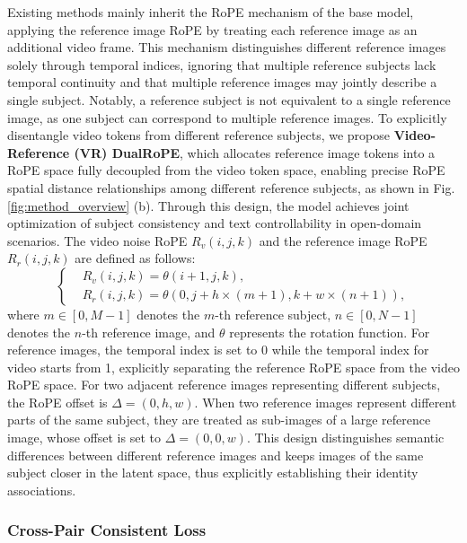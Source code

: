 Existing methods mainly inherit the RoPE mechanism of the base model, applying the reference image RoPE by treating each reference image as an additional video frame. This mechanism distinguishes different reference images solely through temporal indices, ignoring that multiple reference subjects lack temporal continuity and that multiple reference images may jointly describe a single subject. Notably, a reference subject is not equivalent to a single reference image, as one subject can correspond to multiple reference images. To explicitly disentangle video tokens from different reference subjects, we propose \textbf{Video-Reference (VR) DualRoPE}, which allocates reference image tokens into a RoPE space fully decoupled from the video token space, enabling precise RoPE spatial distance relationships among different reference subjects, as shown in Fig. \ref{fig:method_overview} (b). Through this design, the model achieves joint optimization of subject consistency and text controllability in open-domain scenarios. The video noise RoPE $R_v(i,j,k)$ and the reference image RoPE $R_r(i,j,k)$ are defined as follows:
\begin{equation}
\left\{
\begin{aligned}
& R_v(i,j,k) = \theta (i+1,j,k)  , \\
&R_r(i,j,k) = \theta(0,j+h\times(m+1),k+w\times(n+1)),
\end{aligned}
\right.
\end{equation}
where $m \in [0, M-1] $ denotes the $m$-th reference subject, $n \in [0, N-1]$ denotes the $n$-th reference image, and $\theta$ represents the rotation function. For reference images, the temporal index is set to 0 while the temporal index for video starts from 1, explicitly separating the reference RoPE space from the video RoPE space. For two adjacent reference images representing different subjects, the RoPE offset is $\Delta=(0,h,w)$. When two reference images represent different parts of the same subject, they are treated as sub-images of a large reference image, whose offset is set to $\Delta=(0,0,w)$. This design distinguishes semantic differences between different reference images and keeps images of the same subject closer in the latent space, thus explicitly establishing their identity associations.






\subsubsection{ Cross-Pair Consistent Loss}

